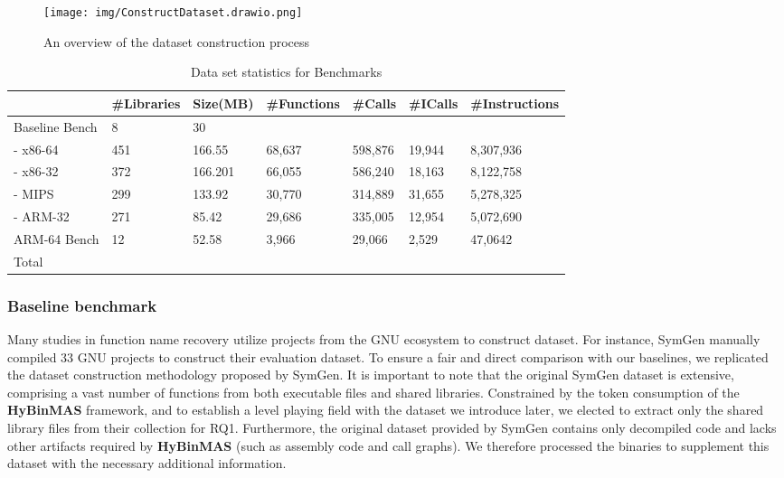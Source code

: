 \documentclass[acmsmall,screen,review,anonymous]{acmart} %
\begin{document}
\begin{figure}[t] %
    \centering
    \texttt{[image: img/ConstructDataset.drawio.png]} %
    \caption{An overview of the dataset construction process} %
    \label{fig:construct-dataset} %
\end{figure}


\renewcommand\arraystretch{1.31}
\begin{table}[tb]
  \centering
  \footnotesize
  \caption{Data set statistics for Benchmarks}\label{table:data}
    \begin{tabular}{p{2cm}p{1cm}p{1cm}p{1cm}p{1cm}p{1cm}p{1.6cm}}
   \toprule
    & \#Libraries & Size(MB)  & \#Functions & \#Calls & \#ICalls & \#Instructions \\
    \hline
    Baseline Bench  & 8 & 30\\
    - x86-64 & 451  & 166.55   & 68,637 & 598,876 & 19,944 & 8,307,936 \\
    - x86-32 &372   & 166.201  & 66,055 & 586,240 & 18,163 & 8,122,758\\
    - MIPS   &299   & 133.92   & 30,770 & 314,889 & 31,655 & 5,278,325\\
    - ARM-32 &271   & 85.42    & 29,686 & 335,005 & 12,954 & 5,072,690\\
    \hline
    ARM-64 Bench & 12 & 52.58  & 3,966  & 29,066  & 2,529  & 47,0642  \\
    \hline
    Total & & & & & &\\
    \bottomrule
  \end{tabular}
  \vspace{-0.2in}
\end{table}
\renewcommand\arraystretch{1.0}


\subsubsection{Baseline benchmark}
Many studies in function name recovery utilize projects from the GNU ecosystem to construct dataset. For instance, SymGen\cite{SymGen} manually compiled 33 GNU projects to construct their evaluation dataset. To ensure a fair and direct comparison with our baselines, we replicated the dataset construction methodology proposed by SymGen. It is important to note that the original SymGen dataset is extensive, comprising a vast number of functions from both executable files and shared libraries. Constrained by the token consumption of the \textbf{HyBinMAS} framework, and to establish a level playing field with the dataset we introduce later, we elected to extract only the shared library files from their collection for RQ1. Furthermore, the original dataset provided by SymGen contains only decompiled code and lacks other artifacts required by \textbf{HyBinMAS} (such as assembly code and call graphs). We therefore processed the binaries to supplement this dataset with the necessary additional information. %
\end{document}
